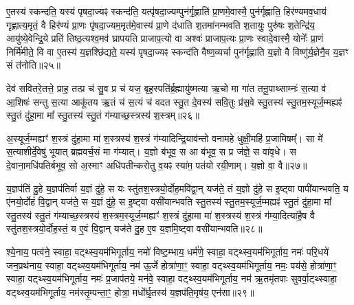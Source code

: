 ए॒तस्य॑ स्कन्दति॒ यस्य॑ पृषदा॒ज्यꣴ स्कन्द॑ति॒ यत्पृ॑षदा॒ज्यम्पुन॑र्गृ॒ह्णाति॑ प्रा॒णमे॒वास्मै॒ पुन॑र्गृह्णाति॒ हिर॑ण्यमव॒धाय॑ गृह्णात्य॒मृतं॒ वै हिर॑ण्यं प्रा॒णः पृ॑षदा॒ज्यम॒मृत॑मे॒वास्य॑ प्रा॒णे द॑धाति श॒तमा॑नम्भवति श॒तायुः॒ पुरु॑षः श॒तेन्द्रि॑य॒ आयु॑ष्ये॒वेन्द्रि॒ये प्रति॑ तिष्ठ॒त्यश्व॒मव॑ घ्रापयति प्राजाप॒त्यो वा अश्वः॑ प्राजाप॒त्यः प्रा॒णः स्वादे॒वास्मै॒ योनेः᳚ प्रा॒णं निर्मि॑मीते॒ वि वा ए॒तस्य॑ य॒ज्ञश्छि॑द्यते॒ यस्य॑ पृषदा॒ज्यꣴ स्कन्द॑ति वैष्ण॒व्यर्चा पुन॑र्गृह्णाति य॒ज्ञो वै विष्णु॑र्य॒ज्ञेनै॒व य॒ज्ञꣳ सं त॑नोति॥२५॥

{\anuvakamend[{ते॒ पृ॒ष॒दा॒ज्यं प्रा॒णो वै योनेः᳚ प्रा॒णन्द्वाविꣳ॑शतिश्च॥६॥}]}

देव॑ सवितरे॒तत्ते॒ प्राह॒ तत्प्र च॑ सु॒व प्र च॑ यज॒ बृह॒स्पति॑र्ब्र॒ह्मायु॑ष्मत्या ऋ॒चो मा गा॑त तनू॒पाथ्साम्नः॑ स॒त्या व॑ आ॒शिषः॑ सन्तु स॒त्या आकू॑तय ऋ॒तं च॑ स॒त्यं च॑ वदत स्तु॒त दे॒वस्य॑ सवि॒तुः प्र॑स॒वे स्तु॒तस्य॑ स्तु॒तम॒स्यूर्ज॒म्मह्यꣴ॑ स्तु॒तं दु॑हा॒मा मा᳚ स्तु॒तस्य॑ स्तु॒तं ग॑म्याच्छ॒स्त्रस्य॑ श॒स्त्रम्॥२६॥

अ॒स्यूर्ज॒म्मह्यꣳ॑ श॒स्त्रं दु॑हा॒मा मा॑ श॒स्त्रस्य॑ श॒स्त्रं ग॑म्यादिन्द्रि॒याव॑न्तो वनामहे धुक्षी॒महि॑ प्र॒जामिषम्᳚। सा मे॑ स॒त्याशीर्दे॒वेषु॑ भूयात् ब्रह्मवर्च॒सं मा ग॑म्यात्। य॒ज्ञो ब॑भूव॒ स आ ब॑भूव॒ स प्र ज॑ज्ञे॒ स वा॑वृधे। स दे॒वाना॒मधि॑पतिर्बभूव॒ सो अ॒स्माꣳ अधि॑पतीन्करोतु व॒यꣴ स्या॑म॒ पत॑यो रयी॒णाम्। य॒ज्ञो वा॒ वै॥२७॥

य॒ज्ञप॑तिं दु॒हे य॒ज्ञप॑तिर्वा य॒ज्ञं दु॑हे॒ स यः स्तु॑तश॒स्त्रयो॒र्दोह॒मवि॑द्वा॒न् यज॑ते॒ तं य॒ज्ञो दु॑हे स इ॒ष्ट्वा पापी॑यान्भवति॒ य ए॑नयो॒र्दोहं॑ वि॒द्वान् यज॑ते॒ स य॒ज्ञं दु॑हे॒ स इ॒ष्ट्वा वसी॑यान्भवति स्तु॒तस्य॑ स्तु॒तम॒स्यूर्ज॒म्मह्यꣴ॑ स्तु॒तं दु॑हा॒मा मा᳚ स्तु॒तस्य॑ स्तु॒तं ग॑म्याच्छ॒स्त्रस्य॑ श॒स्त्रम॒स्यूर्ज॒म्मह्यꣳ॑ श॒स्त्रं दु॑हा॒मा मा॑ श॒स्त्रस्य॑ श॒स्त्रं ग॑म्या॒दित्या॑है॒ष वै स्तु॑तश॒स्त्रयो॒र्दोह॒स्तं॒ य ए॒वं वि॒द्वान् यज॑ते दु॒ह ए॒व य॒ज्ञमि॒ष्ट्वा वसी॑यान्भवति॥२८॥

{\anuvakamend[{श॒स्त्रं वै श॒स्त्रन्दु॑हा॒न्द्वाविꣳ॑शतिश्च॥७॥}]}

श्ये॒नाय॒ पत्व॑ने॒ स्वाहा॒ वट्थ्स्व॒यम॑भिगूर्ताय॒ नमो॑ विष्ट॒म्भाय॒ धर्म॑णे॒ स्वाहा॒ वट्थ्स्व॒यम॑भिगूर्ताय॒ नमः॑ परि॒धये॑ जन॒प्रथ॑नाय॒ स्वाहा॒ वट्थ्स्व॒यम॑भिगूर्ताय॒ नम॑ ऊ॒र्जे होत्रा॑णा॒ꣳ॒ स्वाहा॒ वट्थ्स्व॒यम॑भिगूर्ताय॒ नमः॒ पय॑से॒ होत्रा॑णा॒ꣳ॒ स्वाहा॒ वट्थ्स्व॒यम॑भिगूर्ताय॒ नमः॑ प्र॒जाप॑तये॒ मन॑वे॒ स्वाहा॒ वट्थ्स्व॒यम॑भिगूर्ताय॒ नम॑ ऋ॒तमृ॑तपाः सुवर्वा॒ट्थ्स्वाहा॒ वट्थ्स्व॒यम॑भिगूर्ताय॒ नम॑स्तृ॒म्पन्ता॒ꣳ॒ होत्रा॒ मधो᳚र्घृ॒तस्य॑ य॒ज्ञप॑ति॒मृष॑य॒ एन॑सा॥२९॥

